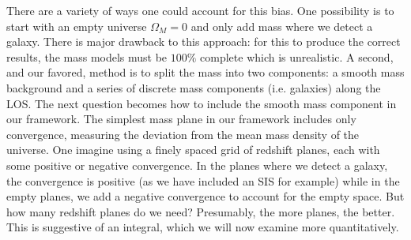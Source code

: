 There are a variety of ways one could account for this bias. One possibility is to start with an empty universe $\Omega_M = 0$ and only add mass where we detect a galaxy. There is major drawback to this approach: for this to produce the correct results, the mass models must be $100\%$ complete which is unrealistic. A second, and our favored, method is to split the mass into two components: a smooth mass background and a series of discrete mass components (i.e. galaxies) along the LOS. The next question becomes how to include the smooth mass component in our framework. The simplest mass plane in our framework includes only convergence, measuring the deviation from the mean mass density of the universe. One imagine using a finely spaced grid of redshift planes, each with some positive or negative convergence. In the planes where we detect a galaxy, the convergence is positive (as we have included an SIS for example) while in the empty planes, we add a negative convergence to account for the empty space. But how many redshift planes do we need? Presumably, the more planes, the better. This is suggestive of an integral, which we will now examine more quantitatively.
  
  